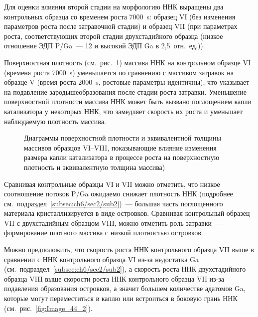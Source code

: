 Для оценки влияния второй стадии на морфологию ННК выращены два контрольных
образца со временем роста 7000~\si{\second}: образец VI (без изменения
параметров роста после затравочной стадии) и образец VII (при параметрах роста,
соответствующих второй стадии двухстадийного образца (низкое отношение ЭДП
P/Ga~--- 12 и высокий ЭДП Ga в 2,5~отн.~ед.)).

Поверхностная плотность (см.~рис.~\cref{fig:Image_44_1}) массива ННК на
контрольном образце VI (временя роста 7000~\si{\second}) уменьшается по
сравнению с массивом затравок на образце V (время роста 2000~\si{\second},
ростовые параметры идентичны), что указывает на подавление зародышеобразования
после стадии роста затравки. Уменьшение поверхностной плотности массива ННК
может быть вызвано поглощением капли катализатора у некоторых ННК, что
замедляет скорость их роста и уменьшает наблюдаемую плотность массива.

\begin{figure}[ht]  
\caption{Диаграммы поверхностной плотности и эквивалентной толщины массивов
образцов VI--VIII, показывающие влияние изменения размера капли катализатора в
процессе роста на поверхностную плотность и эквивалентную толщина
массива)}\label{fig:Image_44_1} \end{figure}

Сравнивая контрольные образцы VI и VII можно отметить, что низкое соотношение
потоков P/Ga ожидаемо снижает плотность ННК (подробнее
см.~подраздел~\cref{subsec:ch6/sec2/sub2})~--- большая часть поглощенного
материала кристаллизируется в виде островков. Сравнивая контрольный образец VII
с двухстадийным образцом VIII, можно отметить роль затравки~--- формирование
плотного массива с низкой плотностью островков.

Можно предположить, что скорость роста ННК контрольного образца VII выше в
сравнении с ННК контрольного образца VI из-за недостатка Ga
(см.~подраздел~\cref{subsec:ch6/sec2/sub2}), а скорость роста ННК
двухстадийного образца VIII выше скорости роста ННК контрольного образца VII
из-за подавления образования островков, а значит большем количестве адатомов
Ga, которые могут переместиться в каплю или встроиться в боковую грань ННК
(см.~рис.~\cref{fig:Image_44_2}).

